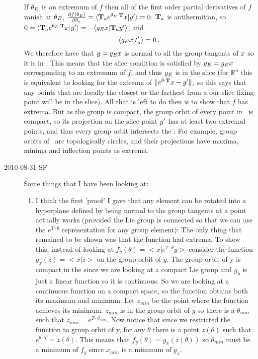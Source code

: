\begin{description}
If ${\bf \theta}_E$ is an extremum of $f$ then all of the first order partial derivatives of $f$ vanish at ${\bf \theta}_E$, $\frac{\partial f(\gSpace_E)}{\partial \gSpace_a} =\braket{\Lg_a e^{\gSpace_E \cdot \Lg} \ssp}{\slicep}=0$. $\mathbf{T}_a$ is antihermitian, so
$0=\braket{\Lg_a e^{\gSpace_E \cdot \Lg}\ssp}{\slicep}
= - \braket{\LieEl_E \ssp}{\Lg_a  \slicep}$,
and
\[
\braket{\LieEl_E \ssp}{\sliceTan{a}} =0
\,.
\]
We therefore have that $y= g_E x$ is normal to all the group tangents of $x$ so it is in \pSRed. This means that the slice condition is satisfied by $y_E = g_E x$ corresponding to an extremum of $f$, and thus $y_E$ is in the slice (for $\mathbb{R}^n$ this is equivalent to looking for the extrema of $\|e^{{\bf \theta} \cdot \mathbf{T}}x - {y'}\|$, so this says that any points that are locally the closest or the farthest from a our slice fixing point will be in the slice). All that is left to do then is to show that $f$ has extrema. But as the group is compact, the group orbit of every point in \pS\ is compact, so its projection on the slice-point ${y'}$ has at least two extremal points, and thus every group orbit intersects the \slice. For example, group orbits of \ are topologically circles, and their projections have maxima, minima and inflection points as extrema.



\item[2010-08-31 SF]
Some things that I have been looking at:

\begin{enumerate}
\item
I think the first 'proof' I gave that any element can be rotated into a hyperplane defined by being normal to the group tangents at a point actually works (provided the Lie group is connected so that we can use the $e^{T \cdot \theta}$ representation for any group element): The only thing that remained to be shown was that the function had extrema. To show this, instead of looking at $f_y(\theta)=<x|e^{T \cdot \theta} y>$ consider the function $g_x(z)=<x|z>$ on the group orbit of $y$. The group orbit of y is compact in the {\statesp} since we are looking at a compact Lie group and $g_y$ is just a linear function so it is continuous. So we are looking at a continuous function on a compact space, so the function obtains both its maximum and minimum. Let $z_{min}$ be the point where the function achieves its minimum. $z_{min}$ is in the group orbit of $y$ so there is a $\theta_{min}$ such that $z_{min}=e^{T \cdot \theta_{min}}$. Now notice that since we restricted the function to group orbit of y, for any $\theta$ there is a point $z(\theta)$ such that $e^{\theta \cdot T}=z(\theta)$. This means that $f_y(\theta)=g_x(z(\theta))$ so $\theta_{min}$ must be a minimum of $f_y$ since $x_{min}$ is a minimum of $g_x$.


\end{enumerate}
\end{description}

